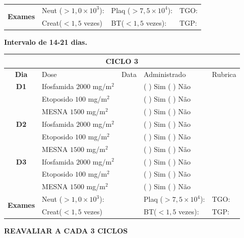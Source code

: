 \documentclass[11pt,a4paper,oldfontcommands]{memoir}
\begin{document}
\begin{center}
\begin{table}[H]
\begin{tabular}{p{1cm}p{5cm}|p{1.4cm}|p{3cm}|p{3cm}}
    \hline
    \multicolumn{1}{c|}{\multirow{2}{*}{\textbf{Exames}}}&\multicolumn{2}{l|}{Neut (\(>1,0\times10^3\)):}&{Plaq (\(>7,5\times10^4\)):}&{TGO:}\\
    \cline{2-5}
    \multicolumn{1}{c|}{\multirow{2}{*}{{}}}&\multicolumn{2}{l|}{Creat(\(<1,5\) vezes)}&{BT(\(<1,5\) vezes):}&{TGP:}
    \\
    \hline
\end{tabular}
\end{table}
\textbf{Intervalo de 14-21 dias.}
\begin{table}[H]
\begin{tabular}{p{1cm}p{5cm}|p{1.4cm}|p{3cm}|p{3cm}}
	\hline
	\multicolumn{5}{c}{\textbf{CICLO 3}}\\
\hline
    \multicolumn{1}{c|}{\multirow{1}{*}{\textbf{Dia}}}&{Dose}&{Data}&{Administrado}&{Rubrica} \\
    \hline
    \multicolumn{1}{c|}{\multirow{1}{*}{\textbf{D1}}}&{Ifosfamida \(2000\) mg/m\(^2\)}&&{(  ) Sim (  ) Não}&\\
    \multicolumn{1}{c|}{\multirow{1}{*}{\textbf{}}}&{Etoposido \(100\) mg/m\(^2\)}&&{(  ) Sim (  ) Não}&\\
    \multicolumn{1}{c|}{\multirow{1}{*}{\textbf{}}}&{MESNA \(1500\) mg/m\(^2\)}&&{(  ) Sim (  ) Não}&\\
    \multicolumn{1}{c|}{\multirow{1}{*}{\textbf{D2}}}&{Ifosfamida \(2000\) mg/m\(^2\)}&&{(  ) Sim (  ) Não}&\\
    \multicolumn{1}{c|}{\multirow{1}{*}{\textbf{}}}&{Etoposido \(100\) mg/m\(^2\)}&&{(  ) Sim (  ) Não}&\\
    \multicolumn{1}{c|}{\multirow{1}{*}{\textbf{}}}&{MESNA \(1500\) mg/m\(^2\)}&&{(  ) Sim (  ) Não}&\\
    \multicolumn{1}{c|}{\multirow{1}{*}{\textbf{D3}}}&{Ifosfamida \(2000\) mg/m\(^2\)}&&{(  ) Sim (  ) Não}&\\
    \multicolumn{1}{c|}{\multirow{1}{*}{\textbf{}}}&{Etoposido \(100\) mg/m\(^2\)}&&{(  ) Sim (  ) Não}&\\
    \multicolumn{1}{c|}{\multirow{1}{*}{\textbf{}}}&{MESNA \(1500\) mg/m\(^2\)}&&{(  ) Sim (  ) Não}&\\

    \hline
    \multicolumn{1}{c|}{\multirow{2}{*}{\textbf{Exames}}}&\multicolumn{2}{l|}{Neut (\(>1,0\times10^3\)):}&{Plaq (\(>7,5\times10^4\)):}&{TGO:}\\
    \cline{2-5}
    \multicolumn{1}{c|}{\multirow{2}{*}{{}}}&\multicolumn{2}{l|}{Creat(\(<1,5\) vezes)}&{BT(\(<1,5\) vezes):}&{TGP:}
    \\
    \hline
\end{tabular}
\end{table}

\textbf{REAVALIAR A CADA 3 CICLOS}
\end{center}
\end{document}
